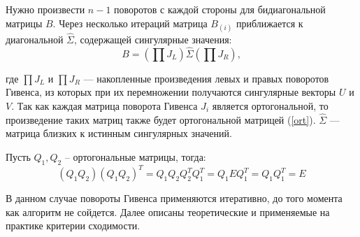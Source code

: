 Нужно произвести \( n-1 \) поворотов с каждой стороны для бидиагональной матрицы \( B \). Через несколько итераций матрица \( B_{(i)} \) приближается к диагональной \( \widehat{\Sigma} \), содержащей сингулярные значения:
\begin{equation}
B = \left( \prod J_L \right) \widehat{\Sigma} \left( \prod J_R \right),
\end{equation}

где \( \prod J_L \) и \( \prod J_R \) — накопленные произведения левых и правых поворотов Гивенса, из которых при их перемножении получаются сингулярные векторы \( U \) и \( V \). Так как каждая матрица поворота Гивенса $J_i$ является ортогональной, то произведение таких матриц также будет ортогональной матрицей (\ref{ort}). $\widehat{\Sigma}$ — матрица близких к истинным сингулярных значений.
\begin{note}
    Пусть $Q_1, Q_2$ -- ортогональные матрицы, тогда: 
    \begin{equation} \label{ort}
        (Q_1Q_2)(Q_1Q_2)^T=Q_1Q_2Q_2^TQ_1^T=Q_1EQ_1^T=Q_1Q_1^T=E
    \end{equation}
\end{note}



В данном случае повороты Гивенса применяются итеративно, до того момента как алгоритм не сойдется. Далее описаны теоретические и применяемые на практике критерии сходимости.


